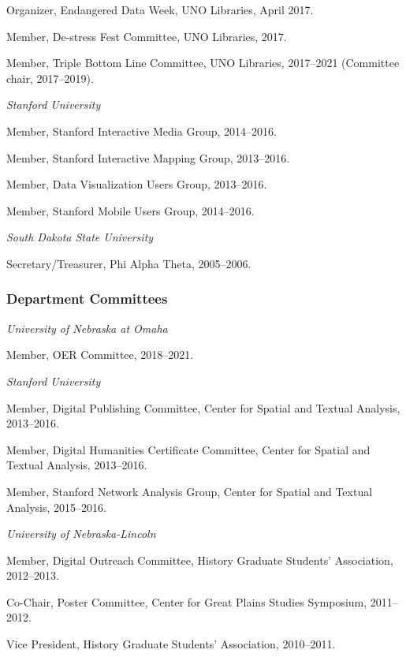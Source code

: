 Organizer, Endangered Data Week, UNO Libraries, April 2017.

Member, De-stress Fest Committee, UNO Libraries, 2017.

Member, Triple Bottom Line Committee, UNO Libraries, 2017--2021
(Committee chair, 2017--2019).

\vspace{.4cm}

\emph{Stanford University}

Member, Stanford Interactive Media Group, 2014--2016.

Member, Stanford Interactive Mapping Group, 2013--2016.

Member, Data Visualization Users Group, 2013--2016.

Member, Stanford Mobile Users Group, 2014--2016.

\vspace{.4cm}

\emph{South Dakota State University}

Secretary/Treasurer, Phi Alpha Theta, 2005--2006.

\subsubsection{Department Committees}\label{department-committees}

\emph{University of Nebraska at Omaha}

Member, OER Committee, 2018--2021.

\vspace{.4cm}

\emph{Stanford University}

Member, Digital Publishing Committee, Center for Spatial and Textual
Analysis, 2013--2016.

Member, Digital Humanities Certificate Committee, Center for Spatial and
Textual Analysis, 2013--2016.

Member, Stanford Network Analysis Group, Center for Spatial and Textual
Analysis, 2015--2016.

\vspace{.4cm}

\emph{University of Nebraska-Lincoln}

Member, Digital Outreach Committee, History Graduate Students'
Association, 2012--2013.

Co-Chair, Poster Committee, Center for Great Plains Studies Symposium,
2011--2012.

Vice President, History Graduate Students' Association, 2010--2011.

